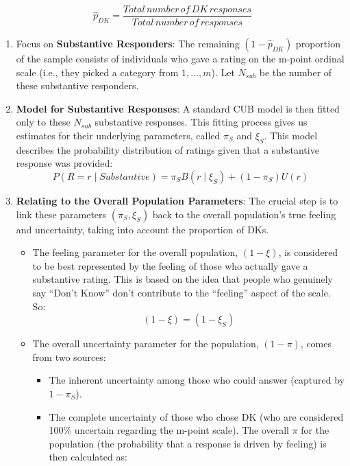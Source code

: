 \documentclass[
  letterpaper,
  DIV=11,
  numbers=noendperiod]{scrartcl}
\providecommand{\tightlist}{%
  \setlength{\itemsep}{0pt}\setlength{\parskip}{0pt}}\usepackage{longtable,booktabs,array}
\begin{document}
\[
 \hat{p}_{DK} = \frac{Total\, number\, of\, DK\, responses}{Total\, number\, of\, responses}
 \]

\begin{enumerate}
\def\labelenumi{\arabic{enumi}.}
\setcounter{enumi}{1}
\item
  Focus on \textbf{Substantive Responders}: The remaining
  \((1- \hat{p}_{DK})\) proportion of the sample consists of individuals
  who gave a rating on the m-point ordinal scale (i.e., they picked a
  category from \(1,…,m\)). Let \(N_{sub}\) be the number of these
  substantive responders.
\item
  \textbf{Model for Substantive Responses}: A standard CUB model is then
  fitted only to these \(N_{sub}\) substantive responses. This fitting
  process gives us estimates for their underlying parameters, called
  \(\pi_S\) and \(\xi_S\). This model describes the probability
  distribution of ratings given that a substantive response was
  provided: \[
   P(R = r \mid Substantive) = \pi_SB(r\mid\xi_S) + (1-\pi_S)U(r)
   \]
\item
  \textbf{Relating to the Overall Population Parameters}: The crucial
  step is to link these parameters \((\pi_S, \xi_S)\) back to the
  overall population's true feeling and uncertainty, taking into account
  the proportion of DKs.

  \begin{itemize}
  \item
    The feeling parameter for the overall population, \((1-\xi)\), is
    considered to be best represented by the feeling of those who
    actually gave a substantive rating. This is based on the idea that
    people who genuinely say ``Don't Know'' don't contribute to the
    ``feeling'' aspect of the scale. So: \[
    (1-\xi) = (1-\xi_S)
    \]
  \item
    The overall uncertainty parameter for the population, \((1-\pi)\),
    comes from two sources:

    \begin{itemize}
    \tightlist
    \item
      The inherent uncertainty among those who could answer (captured by
      \(1-\pi_S\)).
    \item
      The complete uncertainty of those who chose DK (who are considered
      100\% uncertain regarding the m-point scale). The overall \(\pi\)
      for the population (the probability that a response is driven by
      feeling) is then calculated as:
    \end{itemize}
  \end{itemize}
\end{enumerate}
\end{document}
